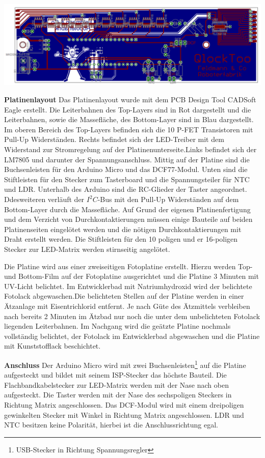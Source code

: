 {
\centering 
\includegraphics[width=\textwidth]{Abbildungen/Elektronik/Layout01} 
}
\begin{multicols}{2}

\textbf{Platinenlayout} Das Platinenlayout wurde mit dem PCB Design Tool CADSoft Eagle erstellt. Die Leiterbahnen des Top-Layers sind in Rot dargestellt und die Leiterbahnen, sowie die Massefläche, des Bottom-Layer sind in Blau dargestellt. Im oberen Bereich des Top-Layers befinden sich die 10 P-FET Transistoren mit  Pull-Up Widerständen. Rechts befindet sich  der LED-Treiber mit dem Widerstand zur Stromregelung auf der Platinenunterseite.Links befindet sich der LM7805 und darunter der Spannungsanschluss. Mittig auf der Platine sind die Buchsenleisten für den Arduino Micro und das DCF77-Modul. Unten sind die Stiftleisten für den Stecker zum Tasterboard und die Spannungsteiler für NTC und LDR. Unterhalb des Arduino sind die RC-Glieder der Taster angeordnet. Ddesweiteren verläuft der $I^{2}C$-Bus mit den Pull-Up Widerständen auf dem Bottom-Layer durch die Massefläche. Auf Grund der eigenen Platinenfertigung und dem Verzicht von Durchkontaktierungen müssen einige Bauteile auf beiden Platinenseiten eingelötet werden und die nötigen Durchkontaktierungen mit Draht erstellt werden. Die Stiftleisten für den 10 poligen und er 16-poligen Stecker zur LED-Matrix werden stirnseitig angelötet. 

Die Platine wird aus einer zweiseitigen Fotoplatine erstellt. Hierzu werden Top- und Bottom-Film auf der Fotoplatine ausgerichtet und die Platine 3 Minuten mit UV-Licht belichtet. Im Entwicklerbad mit Natriumhydroxid wird der belichtete Fotolack abgewaschen.Die belichteten Stellen auf der Platine werden in einer Ätzanlage mit Eisentrichlorid entfernt. Je nach Güte des Ätzmittels verbleiben nach bereits 2 Minuten im Ätzbad nur noch die unter dem unbelichteten Fotolack liegenden Leiterbahnen. Im Nachgang wird die geätzte Platine nochmals vollständig belichtet, der Fotolack im Entwicklerbad abgewaschen und die Platine mit Kunststofflack beschichtet.

\textbf{Anschluss} Der Arduino Micro wird mit zwei Buchsenleisten\footnote{USB-Stecker in Richtung Spannungsregler} auf die Platine aufgesteckt und bildet mit seinem ISP-Stecker das höchste Bauteil. Die Flachbandkabelstecker zur LED-Matrix werden mit der Nase nach oben aufgesteckt. Die Taster werden mit der Nase des sechspoligen Steckers in Richtung Matrix angeschlossen. Das DCF-Modul wird mit einem dreipoligen gewinkelten Stecker mit Winkel in Richtung Matrix angeschlossen. LDR und NTC besitzen keine Polarität, hierbei ist die Anschlussrichtung egal.
\end{multicols}

